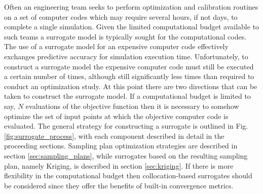 
Often an engineering team seeks to perform optimization and calibration routines on a set of computer codes which may require several hours, if not days, to complete a single simulation. Given the limited computational budget available to such teams a surrogate model is typically sought for the computational codes. The use of a surrogate model for an expensive computer code effectively exchanges predictive accuracy for simulation execution time. Unfortunately, to construct a surrogate model the expensive computer code must still be executed a certain number of times, although still significantly less times than required to conduct an optimization study. At this point there are two directions that can be taken to construct the surrogate model. If a computational budget is limited to say, $N$ evaluations of the objective function then it is necessary to somehow optimize the set of input points at which the objective computer code is evaluated. The general strategy for constructing a surrogate is outlined in Fig. \ref{fig:surrogate_process}, with each component described in detail in the proceeding sections. Sampling plan optimization strategies are described in section \ref{sec:sampling_plans}, while surrogates based on the resulting sampling plan, namely Kriging, is described in section \ref{sec:kriging}. If there is more flexibility in the computational budget then collocation-based surrogates should be considered since they offer the benefits of built-in convergence metrics.        

